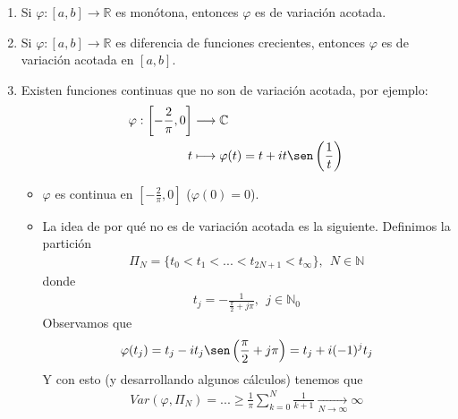 \begin{ejemplo}
    \begin{enumerate}
        \item Si $\varphi : [a,b] \longrightarrow \mathbb{R}$ es monótona, entonces $\varphi$ es de variación acotada.
        \item Si $\varphi : [a,b] \longrightarrow \mathbb{R}$ es diferencia de funciones crecientes, entonces $\varphi$ es de variación acotada en $[a,b]$.
        \item Existen funciones continuas que no son de variación acotada, por ejemplo:
              \begin{align*}
                  \varphi : \left[ -\frac{2}{\pi},0 \right] & \longrightarrow \com                                        \\
                  t                                         & \longmapsto \varphi(t) = t +it\sen\left( \frac{1}{t}\right)
              \end{align*}
              \begin{itemize}
                  \item $\varphi$ es continua en $\left[ -\frac{2}{\pi},0 \right]$ ($\varphi(0) = 0$).
                  \item La idea de por qué no es de variación acotada es la siguiente. Definimos la partición
                        \begin{align*}
                            \Pi_N = \{t_0 < t_1 < ... < t_{2N +1} < t_{\infty} \}, \ \ N \in \mathbb{N}
                        \end{align*}
                        donde
                        \begin{align*}
                            t_j = -\frac{1}{\frac{\pi}{2} + j\pi}, \ \ j \in \mathbb{N}_{0}
                        \end{align*}
                        Observamos que
                        \begin{align*}
                            \varphi(t_j) = t_j - it_j\sen\left( \frac{\pi}{2} +j\pi \right) = t_j + i(-1)^jt_j
                        \end{align*}
                        Y con esto (y desarrollando algunos cálculos) tenemos que
                        \begin{align*}
                            Var(\varphi,\Pi_N) = ... \ge \frac{1}{\pi} \sum_{k=0}^{N}{\frac{1}{k+1}} \xrightarrow[N \to \infty]{} \infty
                        \end{align*}
              \end{itemize}
    \end{enumerate}
\end{ejemplo}

